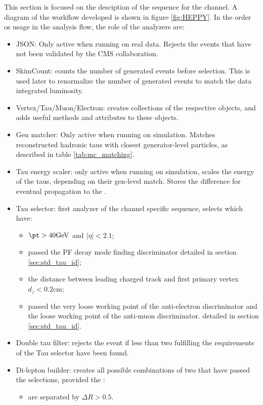This section is focused on the desciption of the sequence for the \tauh\tauh channel. A diagram of the workflow developed is shown in figure \ref{fig:HEPPY}. In the order os usage in the analysis flow, the role of the analyzers are: 
\begin{itemize}
    \item JSON: Only active when running on real data. Rejects the events that have not been validated by the CMS collaboration.
    \item SkimCount: counts the number of generated events before selection. This is used later to renormalize the number of generated events to match the data integrated luminosity.
    \item Vertex/Tau/Muon/Electron: creates collections of the respective objects, and adds useful methods and attributes to these objects.
    \item Gen matcher: Only active when running on simulation. Matches reconstructed hadronic taus with closest generator-level particles, as described in table \ref{tab:mc_matching}.
    \item Tau energy scaler: only active when running on simulation, scales the energy of the taus, depending on their gen-level match. Stores the difference for eventual propagation to the \MET.
    \item Tau selector: first analyzer of the channel specific sequence, selects \tauh which have:
    \begin{itemize}
    \item $\pt > 40 \mathrm{GeV}$ and $|\eta| < 2.1$;
    \item passed the PF decay mode finding discriminator detailed in section \ref{sec:std_tau_id};
    \item  the distance between leading charged track and first primary vertex $d_z < 0.2 \mathrm{cm}$;
    \item passed the very loose working point of the anti-electron discriminator and the loose working point of the anti-muon discriminator. detailed in section \ref{sec:std_tau_id}.
    \end{itemize}
    \item Double tau filter: rejects the event if less than two \tauh fulfilling the requirements of the Tau selector have been found.
    \item Di-lepton builder: creates all possible combinations of two \tauh that have passed the selections, provided the \tauh:
    \begin{itemize}
    \item are separated by $\Delta R > 0.5$.

\end{itemize}
\end{itemize}
